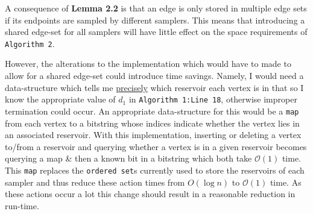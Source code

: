 \documentclass[11pt,twoside,a4paper]{report}
\begin{document}
\vspace{.3cm}\begin{adjustwidth}{.3cm}{}\end{adjustwidth}\vspace{.3cm} %

\par A consequence of \textbf{Lemma 2.2} is that an edge is only stored in multiple edge sets if its endpoints are sampled by different samplers. %
This means that introducing a shared edge-set for all samplers will have little effect on the space requirements of \texttt{Algorithm 2}.
\par However, the alterations to the implementation which would have to made to allow for a shared edge-set could introduce time savings. Namely, I would need a data-structure which tells me \underline{precisely} which reservoir each vertex is in that so I know the appropriate value of $d_1$ in \texttt{Algorithm 1:Line 18}, otherwise improper termination could occur. An appropriate data-structure for this would be a \texttt{map} from each vertex to a bitstring whose indices indicate whether the vertex lies in an associated reservoir. With this implementation, inserting or deleting a vertex to/from a reservoir and querying whether a vertex is in a given reservoir becomes querying a map \& then a known bit in a bitstring which both take $\mathcal{O}(1)$ time. This \texttt{map} replaces the \texttt{ordered set}s currently used to store the reservoirs of each sampler and thus reduce these action times from $O(\log n)$ to $\mathcal{O}(1)$ time. As these actions occur a lot this change should result in a reasonable reduction in run-time. %
\end{document}
